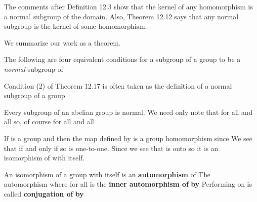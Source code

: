 \documentclass[11pt,oneside]{article}
\begin{document}
\begin{BookBody}
The comments after Definition 12.3 show that the kernel of any homomorphism is a normal subgroup of the domain. Also, Theorem 12.12 says that any normal subgroup is the kernel of some homomorphism.

We summarize our work as a theorem.

 The following are four equivalent conditions for a subgroup  of a group  to be a \textit{normal} subgroup of 





\noindent Condition (2) of Theorem 12.17 is often taken as the definition of a normal subgroup  of a group \BookEnd{\blacklozenge}

 Every subgroup  of an abelian group  is normal. We need only note that  for all  and all  so, of course for all  and all \BookEnd{\blacktriangle}

If  is a group and  then the map  defined by  is a group homomorphism since  We see that  if and only if  so  is one-to-one. Since  we see that  is onto  so it is an isomorphism of  with itself.

 An isomorphism  of a group  with itself is an\textbf{ automorphism} of  The automorphism  where  for all  is the\textbf{ inner automor}\textbf{phism of}  \textbf{by}  Performing  on  is called\textbf{ conjugation of}  \textbf{by} \BookEnd{\blacksquare}


\end{BookBody}
\end{document}
